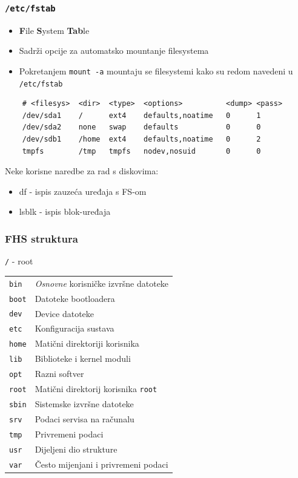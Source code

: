 \documentclass[t]{beamer}
\begin{document}
\begin{frame}[fragile]
	\frametitle{\texttt{/etc/fstab}}
	\begin{itemize}
		\item \textbf{F}ile \textbf{S}ystem \textbf{Tab}le
		\item Sadrži opcije za automatsko mountanje filesystema
		\item Pokretanjem \texttt{mount -a} mountaju se filesystemi kako su redom navedeni u \texttt{/etc/fstab}
	\end{itemize}
	\begin{verbatim}
	# <filesys>  <dir>  <type>  <options>          <dump> <pass>
	/dev/sda1    /      ext4    defaults,noatime   0      1
	/dev/sda2    none   swap    defaults           0      0
	/dev/sdb1    /home  ext4    defaults,noatime   0      2
	tmpfs        /tmp   tmpfs   nodev,nosuid       0      0
	\end{verbatim}

	\vfill
	Neke korisne naredbe za rad s diskovima:
	\begin{itemize}
		\item df - ispis zauzeća uređaja s FS-om
		\item lsblk - ispis blok-uređaja
	\end{itemize}
\end{frame}




\begin{frame}
	\frametitle{FHS struktura}
	\texttt{/} - root\\
	\begin{tabular}{p{3cm} l}
		\texttt{bin} & \emph{Osnovne} korisničke izvršne datoteke \\
		\texttt{boot} & Datoteke bootloadera \\
		\texttt{dev} & Device datoteke \\
		\texttt{etc} & Konfiguracija sustava \\
		\texttt{home} & Matični direktoriji korisnika \\
		\texttt{lib} & Biblioteke i kernel moduli \\
		\texttt{opt} & Razni softver \\
		\texttt{root} & Matični direktorij korisnika \texttt{root} \\
		\texttt{sbin} & Sistemske izvršne datoteke \\
		\texttt{srv} & Podaci servisa na računalu \\
		\texttt{tmp} & Privremeni podaci \\
		\texttt{usr} & Dijeljeni dio strukture \\
		\texttt{var} & Često mijenjani i privremeni podaci 
	\end{tabular}
\end{frame}
\end{document}
